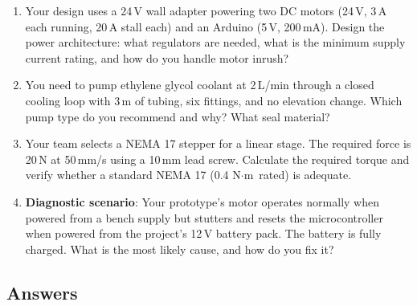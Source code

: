 \documentclass[11pt,letterpaper,twoside,openany]{book}
\begin{document}
\begin{enumerate}[resume,leftmargin=1.5em]
  \item Your design uses a 24\,V wall adapter powering two DC motors (24\,V, 3\,A each running, 20\,A stall each) and an Arduino (5\,V, 200\,mA). Design the power architecture: what regulators are needed, what is the minimum supply current rating, and how do you handle motor inrush?

  \item You need to pump ethylene glycol coolant at 2\,L/min through a closed cooling loop with 3\,m of tubing, six fittings, and no elevation change. Which pump type do you recommend and why? What seal material?

  \item Your team selects a NEMA 17 stepper for a linear stage. The required force is 20\,N at 50\,mm/s using a 10\,mm lead screw. Calculate the required torque and verify whether a standard NEMA 17 (0.4\,\ensuremath{\text{N}\cdot\text{m}} rated) is adequate.

  \item \textbf{Diagnostic scenario}: Your prototype's motor operates normally when powered from a bench supply but stutters and resets the microcontroller when powered from the project's 12\,V battery pack. The battery is fully charged. What is the most likely cause, and how do you fix it?
\end{enumerate}

\subsection{Answers}
\end{document}
